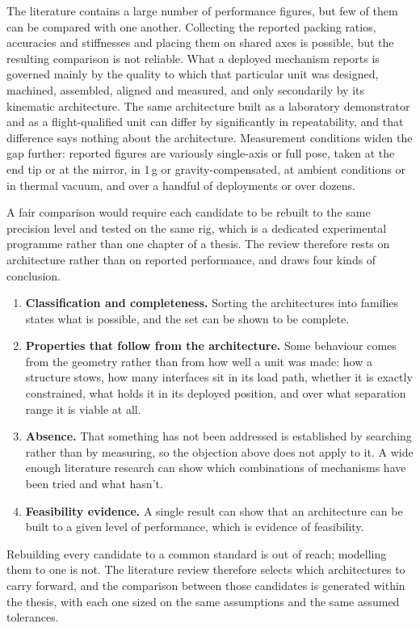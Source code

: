 The literature contains a large number of performance figures, but few of them can be compared with one another. Collecting the reported packing ratios, accuracies and stiffnesses and placing them on shared axes is possible, but the resulting comparison is not reliable. What a deployed mechanism reports is governed mainly by the quality to which that particular unit was designed, machined, assembled, aligned and measured, and only secondarily by its kinematic architecture. The same architecture built as a laboratory demonstrator and as a flight-qualified unit can differ by significantly in repeatability, and that difference says nothing about the architecture. Measurement conditions widen the gap further: reported figures are variously single-axis or full pose, taken at the end tip or at the mirror, in 1\,g or gravity-compensated, at ambient conditions or in thermal vacuum, and over a handful of deployments or over dozens.

A fair comparison would require each candidate to be rebuilt to the same precision level and tested on the same rig, which is a dedicated experimental programme rather than one chapter of a thesis. The review therefore rests on architecture rather than on reported performance, and draws four kinds of conclusion.

\begin{enumerate}
    \item \textbf{Classification and completeness.} Sorting the architectures into families states what is possible, and the set can be shown to be complete.
    \item \textbf{Properties that follow from the architecture.} Some behaviour comes from the geometry rather than from how well a unit was made: how a structure stows, how many interfaces sit in its load path, whether it is exactly constrained, what holds it in its deployed position, and over what separation range it is viable at all.
    \item \textbf{Absence.} That something has not been addressed is established by searching rather than by measuring, so the objection above does not apply to it. A wide enough literature research can show which combinations of mechanisms have been tried and what hasn't.
    \item \textbf{Feasibility evidence.} A single result can show that an architecture can be built to a given level of performance, which is evidence of feasibility.
\end{enumerate}

Rebuilding every candidate to a common standard is out of reach; modelling them to one is not. The literature review therefore selects which architectures to carry forward, and the comparison between those candidates is generated within the thesis, with each one sized on the same assumptions and the same assumed tolerances.

